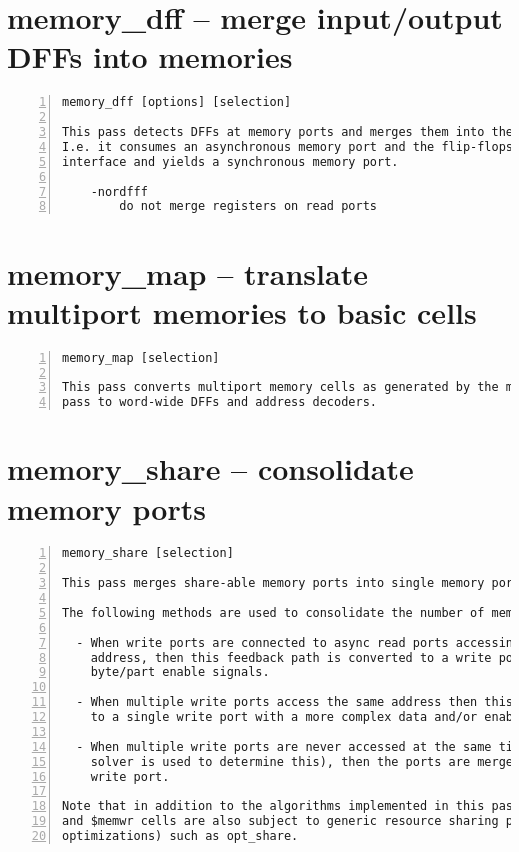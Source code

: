 \section{memory\_dff -- merge input/output DFFs into memories}
\label{cmd:memory_dff}
\begin{lstlisting}[numbers=left,frame=single]
    memory_dff [options] [selection]

This pass detects DFFs at memory ports and merges them into the memory port.
I.e. it consumes an asynchronous memory port and the flip-flops at its
interface and yields a synchronous memory port.

    -nordfff
        do not merge registers on read ports
\end{lstlisting}

\section{memory\_map -- translate multiport memories to basic cells}
\label{cmd:memory_map}
\begin{lstlisting}[numbers=left,frame=single]
    memory_map [selection]

This pass converts multiport memory cells as generated by the memory_collect
pass to word-wide DFFs and address decoders.
\end{lstlisting}

\section{memory\_share -- consolidate memory ports}
\label{cmd:memory_share}
\begin{lstlisting}[numbers=left,frame=single]
    memory_share [selection]

This pass merges share-able memory ports into single memory ports.

The following methods are used to consolidate the number of memory ports:

  - When write ports are connected to async read ports accessing the same
    address, then this feedback path is converted to a write port with
    byte/part enable signals.

  - When multiple write ports access the same address then this is converted
    to a single write port with a more complex data and/or enable logic path.

  - When multiple write ports are never accessed at the same time (a SAT
    solver is used to determine this), then the ports are merged into a single
    write port.

Note that in addition to the algorithms implemented in this pass, the $memrd
and $memwr cells are also subject to generic resource sharing passes (and other
optimizations) such as opt_share.
\end{lstlisting}

